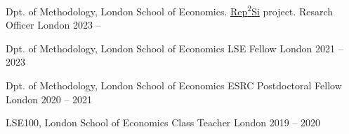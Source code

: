 

\begin{cventries}

  \cventry
    {Dpt. of Methodology, London School of Economics. \textcolor{plainblue}{\href{https://rep2si.github.io/}{Rep\textsuperscript{2}Si}} project.} %
    {Resarch Officer} %
    {London} %
    {2023 --} %
    {
    }

  \cventry
    {Dpt. of Methodology, London School of Economics} %
    {LSE Fellow} %
    {London} %
    {2021 -- 2023} %
    {
    }

  \cventry
    {Dpt. of Methodology, London School of Economics} %
    {ESRC Postdoctoral Fellow} %
    {London} %
    {2020 -- 2021} %
    {
    }

  \cventry
    {LSE100, London School of Economics} %
    {Class Teacher} %
    {London} %
    {2019 -- 2020} %
    {
    }

\end{cventries}

